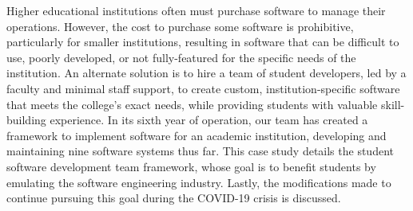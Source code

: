 Higher educational institutions often must purchase software to manage their operations. However, the cost to purchase some  software is prohibitive, particularly for smaller institutions, resulting in software that can be difficult to use, poorly developed, or not fully-featured for the specific needs of the institution. An alternate solution is to hire a team of student developers, led by a faculty and minimal staff support, to create custom, institution-specific software that meets the college's exact needs, while providing students with valuable skill-building experience. In its sixth year of operation, our team has created a framework to implement software for an academic institution, developing and maintaining nine software systems thus far. This case study details the student software development team framework, whose goal is to benefit students by emulating the software engineering industry. Lastly, the modifications made to continue pursuing this goal during the COVID-19 crisis is discussed.
